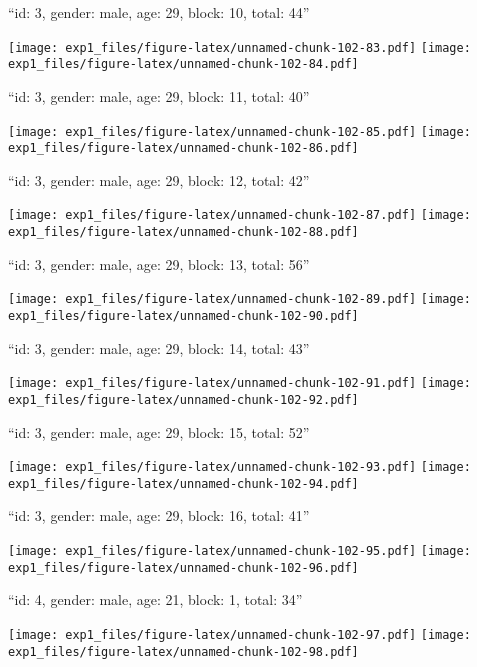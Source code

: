 \documentclass[11pt,,]{article}
\begin{document}
\newpage
[1] 

``id: 3, gender: male, age: 29, block: 10, total: 44''

\texttt{[image: exp1\_files/figure-latex/unnamed-chunk-102-83.pdf]}
\texttt{[image: exp1\_files/figure-latex/unnamed-chunk-102-84.pdf]}

\newpage
[1] 

``id: 3, gender: male, age: 29, block: 11, total: 40''

\texttt{[image: exp1\_files/figure-latex/unnamed-chunk-102-85.pdf]}
\texttt{[image: exp1\_files/figure-latex/unnamed-chunk-102-86.pdf]}

\newpage
[1] 

``id: 3, gender: male, age: 29, block: 12, total: 42''

\texttt{[image: exp1\_files/figure-latex/unnamed-chunk-102-87.pdf]}
\texttt{[image: exp1\_files/figure-latex/unnamed-chunk-102-88.pdf]}

\newpage
[1] 

``id: 3, gender: male, age: 29, block: 13, total: 56''

\texttt{[image: exp1\_files/figure-latex/unnamed-chunk-102-89.pdf]}
\texttt{[image: exp1\_files/figure-latex/unnamed-chunk-102-90.pdf]}

\newpage
[1] 

``id: 3, gender: male, age: 29, block: 14, total: 43''

\texttt{[image: exp1\_files/figure-latex/unnamed-chunk-102-91.pdf]}
\texttt{[image: exp1\_files/figure-latex/unnamed-chunk-102-92.pdf]}

\newpage
[1] 

``id: 3, gender: male, age: 29, block: 15, total: 52''

\texttt{[image: exp1\_files/figure-latex/unnamed-chunk-102-93.pdf]}
\texttt{[image: exp1\_files/figure-latex/unnamed-chunk-102-94.pdf]}

\newpage
[1] 

``id: 3, gender: male, age: 29, block: 16, total: 41''

\texttt{[image: exp1\_files/figure-latex/unnamed-chunk-102-95.pdf]}
\texttt{[image: exp1\_files/figure-latex/unnamed-chunk-102-96.pdf]}

\newpage
[1] 

``id: 4, gender: male, age: 21, block: 1, total: 34''

\texttt{[image: exp1\_files/figure-latex/unnamed-chunk-102-97.pdf]}
\texttt{[image: exp1\_files/figure-latex/unnamed-chunk-102-98.pdf]}
\end{document}
